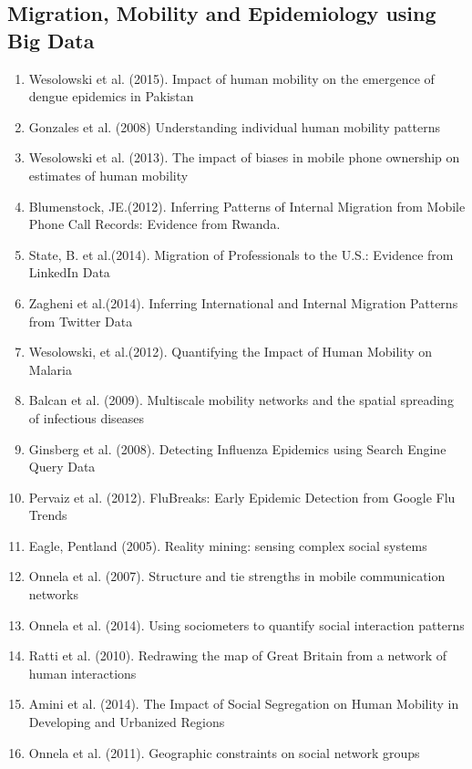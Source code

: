 \subsection{Migration, Mobility and Epidemiology using Big Data}  
\begin{enumerate} 
\item Wesolowski et al. (2015). Impact of human mobility on the emergence of dengue epidemics in Pakistan\cite{Wesolowski_2015}
\item Gonzales et al. (2008)  Understanding individual human mobility patterns\cite{Gonz_lez_2008} 
\item Wesolowski et al. (2013).  The impact of biases in mobile phone ownership on estimates of human mobility\cite{Wesolowski_2013}  
\item  Blumenstock, JE.(2012).  Inferring Patterns of Internal Migration from Mobile Phone Call Records: Evidence from Rwanda\cite{Blumenstock_2012}.   
\item  State, B. et al.(2014).  Migration of Professionals to the U.S.: Evidence from LinkedIn Data\cite{State_2014}  
\item  Zagheni et al.(2014).  Inferring International and Internal Migration Patterns from Twitter Data \cite{Zagheni:2014:III:2567948.2576930}  
\item  Wesolowski, et al.(2012).  Quantifying the Impact of Human Mobility on Malaria \cite{Wesolowski_2012} 
\item Balcan et al. (2009).  Multiscale mobility networks and the spatial spreading of infectious diseases\cite{Balcan_2009}  
\item Ginsberg et al. (2008).  Detecting Influenza Epidemics using Search Engine Query Data\cite{Ginsberg_2008} 
\item Pervaiz et al. (2012).  FluBreaks: Early Epidemic Detection from Google Flu Trends\cite{Pervaiz_2012}   
\item Eagle, Pentland (2005).  Reality mining: sensing complex social systems\cite{Eagle_2005} 
\item Onnela et al. (2007).  Structure and tie strengths in mobile communication networks\cite{Onnela_2007}   
\item Onnela et al. (2014).  Using sociometers to quantify social interaction patterns\cite{Onnela_2014}   
\item Ratti et al. (2010).  Redrawing the map of Great Britain from a network of human interactions\cite{Ratti_2010} 
\item Amini et al. (2014).  The Impact of Social Segregation on Human Mobility in Developing and Urbanized Regions\cite{Amini_2014}   
\item Onnela et al. (2011).  Geographic constraints on social network groups\cite{Onnela_2011} 


\end{enumerate}
